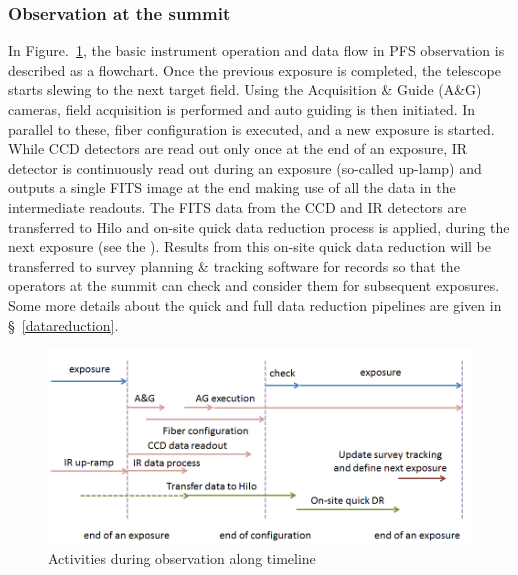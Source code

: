 \documentclass[a4paper,notitlepage]{article}
\begin{document}
\subsubsection{Observation at the summit}

In Figure.~\ref{fig:sciops-scireq-slide-oneexp}, the basic instrument
operation and data flow in PFS observation is described as a
flowchart. Once the previous exposure is completed, the telescope starts
slewing to the next target field. Using the Acquisition \& Guide (A\&G)
cameras, field acquisition is performed and auto guiding is then
initiated. In parallel to these, fiber configuration is executed, and a
new exposure is started. While CCD detectors are read out only once at
the end of an exposure, IR detector is continuously read out during an
exposure (so-called up-lamp) and outputs a single FITS image at the end
making use of all the data in the intermediate readouts. The FITS data
from the CCD and IR detectors are transferred to Hilo and on-site quick
data reduction process is applied, during the next exposure (see the
). Results from this on-site quick data reduction will be transferred to
survey planning \& tracking software for records so that the operators
at the summit can check and consider them for subsequent exposures. Some
more details about the quick and full data reduction pipelines are given
in \S~\ref{datareduction}.

\begin{figure}[htb]
  \begin{center}
    \includegraphics[width=.75\linewidth]{sciops-scireq-slide-oneexp.png}
  \end{center}
  \caption{Activities during observation along timeline}
  \label{fig:sciops-scireq-slide-oneexp}
\end{figure}
\end{document}
